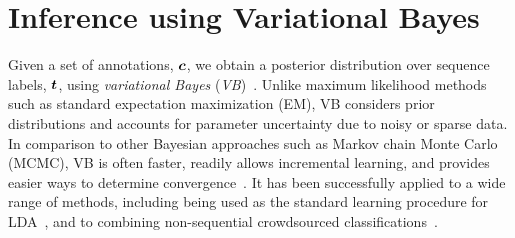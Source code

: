 \section{Inference using Variational Bayes} \label{sec:vb}
 
Given a set of annotations, $\boldsymbol c$, 
we obtain a posterior distribution over 
sequence labels, $\boldsymbol t$, using
\emph{variational Bayes} (\emph{VB})~\cite{attias_advances_2000}.
Unlike maximum likelihood methods such as standard expectation maximization (EM),
VB considers prior distributions 
and accounts for parameter uncertainty due to 
noisy or sparse data.
In comparison to other Bayesian approaches such as Markov chain Monte Carlo (MCMC),
VB is often faster, readily allows incremental learning, and provides easier ways
to determine convergence~\cite{Bishop2006}. 
It has been successfully applied to a wide range of methods,
including being used as the standard learning procedure for LDA~\cite{blei2003},
and to combining non-sequential crowdsourced classifications~\cite{simpsonlong}.

